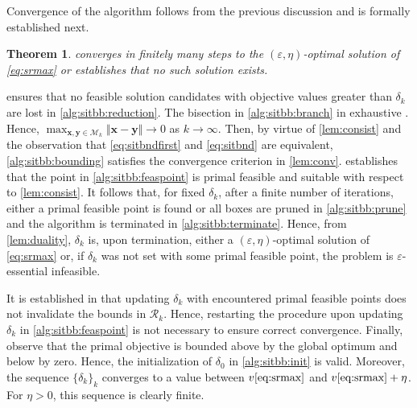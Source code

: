 \documentclass[a4paper,10pt,journal]{IEEEtran}
\let\vec\bm
\newtheorem{theorem}{Theorem}
\begin{document}
Convergence of the algorithm follows from the previous discussion and is formally established next.
\begin{theorem} \label{thm:sitbb}
	 converges in finitely many steps to the $(\varepsilon, \eta)$-optimal solution of \cref{eq:srmax} or establishes that no such solution exists.
\end{theorem}
\begin{IEEEproof}
	\renewcommand{\crefrangeconjunction}{--}
	 ensures that no feasible solution candidates with objective values greater than $\delta_k$ are lost in \ref{alg:sitbb:reduction}.
	The bisection in \ref{alg:sitbb:branch} in exhaustive \cite[Cor.~6.2]{Tuy2016}. Hence, $\max_{\vec x, \vec y\in\mathcal M_k} \Vert \vec x - \vec y \Vert \rightarrow 0$ as $k\to\infty$. Then, by virtue of \cref{lem:consist} and the observation that \cref{eq:sitbndfirst} and \cref{eq:sitbnd} are equivalent, \ref{alg:sitbb:bounding} satisfies the convergence criterion in \cref{lem:conv}.  establishes that the point in \ref{alg:sitbb:feaspoint} is primal feasible and suitable with respect to \cref{lem:consist}. It follows that, for fixed $\delta_k$, after a finite number of iterations, either a primal feasible point is found or all boxes are pruned in \ref{alg:sitbb:prune} and the algorithm is terminated in \ref{alg:sitbb:terminate}. Hence, from \cref{lem:duality}, $\delta_k$ is, upon termination, either a $(\varepsilon, \eta)$-optimal solution of \cref{eq:srmax} or, if $\delta_k$ was not set with some primal feasible point, the problem is $\varepsilon$-essential infeasible.

	It is established in \cite[App.~C]{sit} that updating $\delta_k$ with encountered primal feasible points does not invalidate the bounds in $\mathscr R_k$. Hence, restarting the procedure upon updating $\delta_k$ in \ref{alg:sitbb:feaspoint} is not necessary to ensure correct convergence. Finally, observe that the primal objective is bounded above by the global optimum and below by zero. Hence, the initialization of $\delta_0$ in \ref{alg:sitbb:init} is valid. Moreover, the sequence $\{ \delta_k \}_k$ converges to a value between $v\eqref{eq:srmax}$ and $v\eqref{eq:srmax} + \eta$. For $\eta > 0$, this sequence is clearly finite.
\end{IEEEproof}
\end{document}
